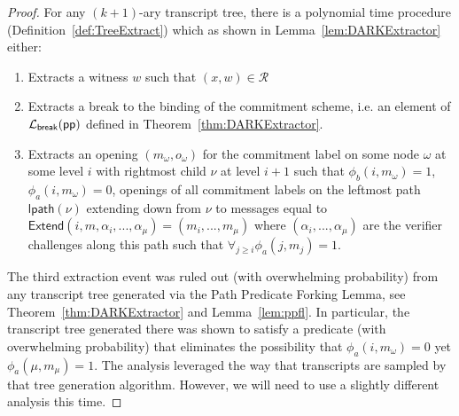 \begin{proof}
	 For any $(k+1)$-ary transcript tree, there is a polynomial time procedure (Definition~\ref{def:TreeExtract}) which as shown in Lemma~\ref{lem:DARKExtractor} either: 
	 \begin{enumerate}[label=(\alph*)]
	 	\item Extracts a witness $w$ such that $(x, w) \in \mathcal{R}$
	 	\item Extracts a break to the binding of the commitment scheme, i.e. an element of $\mathcal{L}_\textsf{break}(\textsf{pp})$ defined in Theorem~\ref{thm:DARKExtractor}.
	 	\item Extracts an opening $(m_\omega, o_\omega)$ for the commitment label on some node $\omega$ at some level $i$ with rightmost child $\nu$ at level $i+1$ such that $\phi_b(i, m_\omega) = 1$, $\phi_a(i, m_\omega) = 0$, openings of all commitment labels on the leftmost path $\textsf{lpath}(\nu)$ extending down from $\nu$ to messages equal to $\textsf{Extend}(i, m, \alpha_i,...,\alpha_\mu) = (m_i,...,m_\mu)$ where $(\alpha_i,...,\alpha_\mu)$ are the verifier challenges along this path such that $\forall_{j \geq i} \phi_a(j, m_j) = 1$. 
	 \end{enumerate}
	 
	 The third extraction event was ruled out (with overwhelming probability) from any transcript tree generated via the Path Predicate Forking Lemma, see Theorem~\ref{thm:DARKExtractor} and Lemma~\ref{lem:ppfl}. In particular, the transcript tree generated there was shown to satisfy a predicate (with overwhelming probability) that eliminates the possibility that $\phi_a(i, m_\omega) = 0$ yet $\phi_a(\mu, m_\mu) = 1$. The analysis leveraged the way that transcripts are sampled by that tree generation algorithm. However, we will need to use a slightly different analysis this time.  
	 

\end{proof}
